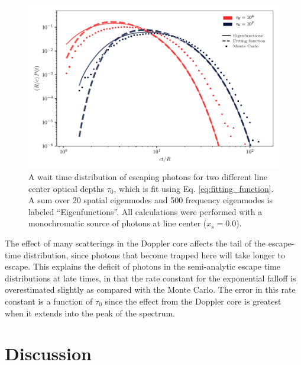 \documentclass{aastex63}
\begin{document}
\begin{figure}
    \centering
    \includegraphics{waittime.pdf}
    \caption{A wait time distribution of escaping photons for two different line center optical depths $\tau_0$, which is fit using Eq. \ref{eq:fitting_function}. A sum over 20 spatial eigenmodes and 500 frequency eigenmodes is labeled ``Eigenfunctions''. All calculations were performed with a monochromatic source of photons at line center ($x_s = 0.0$).}
    \label{fig:escape_time}
\end{figure}

The effect of many scatterings in the Doppler core affects the tail of the escape-time distribution, since photons that become trapped here will take longer to escape. This explains the deficit of photons in the semi-analytic escape time distributions at late times, in that the rate constant for the exponential falloff is overestimated slightly as compared with the Monte Carlo. The error in this rate constant is a function of $\tau_0$ since the effect from the Doppler core is greatest when it extends into the peak of the spectrum.

\section{Discussion}
\end{document}
